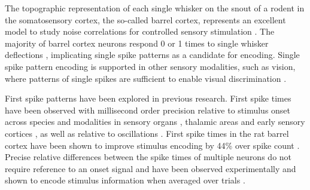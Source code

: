 \documentclass{article}
\begin{document}





The topographic representation of each single whisker on the snout of a rodent in the somatosensory cortex, the so-called barrel cortex, represents an excellent model to study noise correlations for controlled sensory stimulation \cite{feldmeyer2013barrel}. 
The majority of barrel cortex neurons respond 0 or 1 times to single whisker deflections \cite{reyes2014laminar}, implicating single spike patterns as a candidate for encoding. Single spike pattern encoding is supported in other sensory modalities, such as vision, where patterns of single spikes are sufficient to enable visual discrimination \cite{resulaj2018first}. 

First spike patterns have been explored in previous research. First spike times have been observed with millisecond order precision relative to stimulus onset across species and modalities in sensory organs \cite{johansson2004first, uzzell2004precision, gollisch2008rapid}, thalamic areas \cite{reinagel2002precise, storchi2012comparison} and early sensory cortices \cite{reyes2014laminar}, as well as relative to oscillations \cite{havenith2011synchrony}. First spike times in the rat barrel cortex have been shown to improve stimulus encoding by 44\% over spike count \cite{panzeri2001role}. Precise relative differences between the spike times of multiple neurons \cite{izhikevich2006polychronization} do not require reference to an onset signal and have been observed experimentally \cite{johansson2004first, gollisch2008rapid, reyes2014laminar} and shown to encode stimulus information when averaged over trials \cite{gollisch2008rapid}. 
\end{document}
